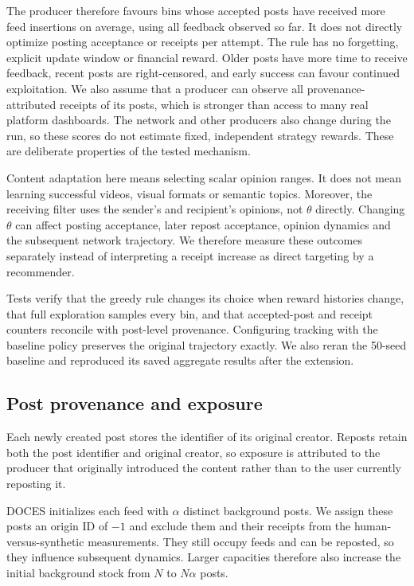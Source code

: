 \documentclass[runningheads]{llncs}
\begin{document}
The producer therefore favours bins whose accepted posts have received more feed insertions on average, using all feedback observed so far. It does not directly optimize posting acceptance or receipts per attempt. The rule has no forgetting, explicit update window or financial reward. Older posts have more time to receive feedback, recent posts are right-censored, and early success can favour continued exploitation. We also assume that a producer can observe all provenance-attributed receipts of its posts, which is stronger than access to many real platform dashboards. The network and other producers also change during the run, so these scores do not estimate fixed, independent strategy rewards. These are deliberate properties of the tested mechanism.

Content adaptation here means selecting scalar opinion ranges. It does not mean learning successful videos, visual formats or semantic topics. Moreover, the receiving filter uses the sender's and recipient's opinions, not \(\theta\) directly. Changing \(\theta\) can affect posting acceptance, later repost acceptance, opinion dynamics and the subsequent network trajectory. We therefore measure these outcomes separately instead of interpreting a receipt increase as direct targeting by a recommender.

Tests verify that the greedy rule changes its choice when reward histories change, that full exploration samples every bin, and that accepted-post and receipt counters reconcile with post-level provenance. Configuring tracking with the baseline policy preserves the original trajectory exactly. We also reran the 50-seed baseline and reproduced its saved aggregate results after the extension.

\subsection{Post provenance and exposure}
Each newly created post stores the identifier of its original creator. Reposts retain both the post identifier and original creator, so exposure is attributed to the producer that originally introduced the content rather than to the user currently reposting it.

DOCES initializes each feed with \(\alpha\) distinct background posts. We assign these posts an origin ID of \(-1\) and exclude them and their receipts from the human-versus-synthetic measurements. They still occupy feeds and can be reposted, so they influence subsequent dynamics. Larger capacities therefore also increase the initial background stock from \(N\) to \(N\alpha\) posts.
\end{document}
